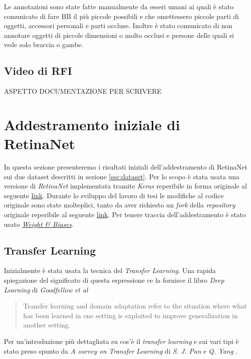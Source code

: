 Le annotazioni sono state fatte manualmente da esseri umani ai quali è stato comunicato di fare \ac{BB} il più piccole possibili e che omettessero piccole parti di oggetti, accessori personali e parti occluse. Inoltre è stato comunicato di non annotare oggetti di piccole dimensioni o molto occlusi e persone delle quali si vede solo braccia o gambe.

\subsection{Video di RFI}
\label{subsec:rfi_video}
ASPETTO DOCUMENTAZIONE PER SCRIVERE

\section{Addestramento iniziale di RetinaNet}
\label{sec:addestramento_iniziale_di_retinanet}
In questa sezione presenteremo i risultati iniziali dell'addestramento di RetinaNet sui due dataset descritti in sezione \ref{sec:dataset}. Per lo scopo è stata usata una versione di \textit{RetinaNet} implementata tramite \textit{Keras} reperibile in forma originale al seguente \href{https://github.com/fizyr/keras-retinanet}{link}. Durante lo sviluppo del lavoro di tesi le modifiche al codice originale sono state molteplici, tanto da aver richiesto un \textit{fork} della \textit{repository} originale reperibile al seguente \href{https://github.com/iskorini/keras-retinanet}{link}. Per tenere traccia dell'addestramento è stato usato \href{https://www.wandb.com}{\textit{Weight \& Biases}}.
\subsection{Transfer Learning}
\label{subsec:transfer_learning}
Inizialmente è stata usata la tecnica del \textit{Transfer Learning}. Una rapida spiegazione del significato di questa espressione ce la fornisce il libro \textit{Deep Learning} di \textit{Goodfellow et al} \cite{Goodfellow-et-al-2016}
\begin{quote}
    Transfer learning and domain adaptation refer to the situation where what has been learned in one setting is exploited to improve generalization in another setting.
\end{quote}
Per un'introduzione più dettagliata su cos'è il \textit{transfer learning} e sui vari tipi è stato preso spunto da \textit{A survey on Transfer Learning} di \textit{S. J. Pan} e \textit{Q. Yang} \cite{5288526}. 

